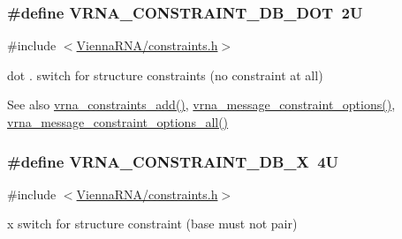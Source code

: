 \subsubsection[{V\+R\+N\+A\+\_\+\+C\+O\+N\+S\+T\+R\+A\+I\+N\+T\+\_\+\+D\+B\+\_\+\+D\+O\+T}]{\setlength{\rightskip}{0pt plus 5cm}\#define V\+R\+N\+A\+\_\+\+C\+O\+N\+S\+T\+R\+A\+I\+N\+T\+\_\+\+D\+B\+\_\+\+D\+O\+T~2\+U}\label{group__constraints_ga369bea82eae75fbe626f409fa425747e}


{\ttfamily \#include $<$\hyperlink{constraints_8h}{Vienna\+R\+N\+A/constraints.\+h}$>$}



dot \textquotesingle{}.\textquotesingle{} switch for structure constraints (no constraint at all) 

\begin{DoxySeeAlso}{See also}
\hyperlink{group__constraints_ga35a401f680969a556858a8dd5f1d07cc}{vrna\+\_\+constraints\+\_\+add()}, \hyperlink{group__constraints_gaa1f20b53bf09ac2e6b0dbb13f7d89670}{vrna\+\_\+message\+\_\+constraint\+\_\+options()}, \hyperlink{group__constraints_gaec7e13fa0465c2acc7a621d1aecb709f}{vrna\+\_\+message\+\_\+constraint\+\_\+options\+\_\+all()} 
\end{DoxySeeAlso}
\hypertarget{group__constraints_ga7283bbe0f8954f7b030ecc3f2d1932b2}{}
\subsubsection[{V\+R\+N\+A\+\_\+\+C\+O\+N\+S\+T\+R\+A\+I\+N\+T\+\_\+\+D\+B\+\_\+\+X}]{\setlength{\rightskip}{0pt plus 5cm}\#define V\+R\+N\+A\+\_\+\+C\+O\+N\+S\+T\+R\+A\+I\+N\+T\+\_\+\+D\+B\+\_\+\+X~4\+U}\label{group__constraints_ga7283bbe0f8954f7b030ecc3f2d1932b2}


{\ttfamily \#include $<$\hyperlink{constraints_8h}{Vienna\+R\+N\+A/constraints.\+h}$>$}



\textquotesingle{}x\textquotesingle{} switch for structure constraint (base must not pair) 

